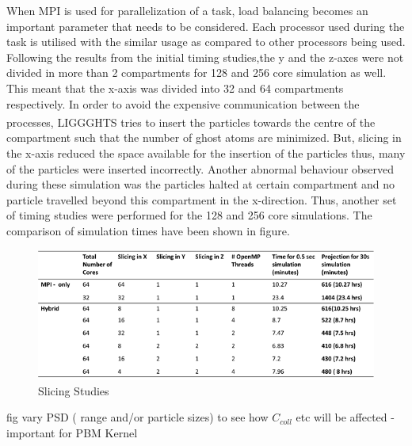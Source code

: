 \documentclass[preprint,11pt,authoryear]{elsarticle}
\begin{document}
		  \par When MPI is used for parallelization of a task, load balancing becomes an important parameter that needs to be considered. Each processor used during the task is utilised with the similar usage as compared to other processors being used. Following the results from the initial timing studies,the y and the z-axes were not divided in more than 2 compartments for 128 and 256 core simulation as well. This meant that the x-axis was divided into 32 and 64 compartments respectively. In order to avoid the expensive communication between the processes, LIGGGHTS\textsuperscript{\textregistered} tries to insert the particles towards the centre of the compartment such that the number of ghost atoms are minimized. But, slicing in the x-axis reduced the space available for the insertion of the particles thus, many of the particles were inserted incorrectly. Another abnormal behaviour observed during these simulation was the particles halted at certain compartment and no particle travelled beyond this compartment in the x-direction. Thus, another set of timing studies were performed for the 128 and 256 core simulations. The comparison of simulation times have been shown in figure.
		  
		  \begin{figure}[H]
		  \centering		  	      
	      \includegraphics[scale=0.75]{slicing_studies.png}
	      \caption{ Slicing Studies}
	      \end{figure}
	    
	    \par fig vary PSD ( range and/or particle sizes) to see how $C_{coll}$ etc will be affected - important for PBM Kernel
	        
\end{document}
